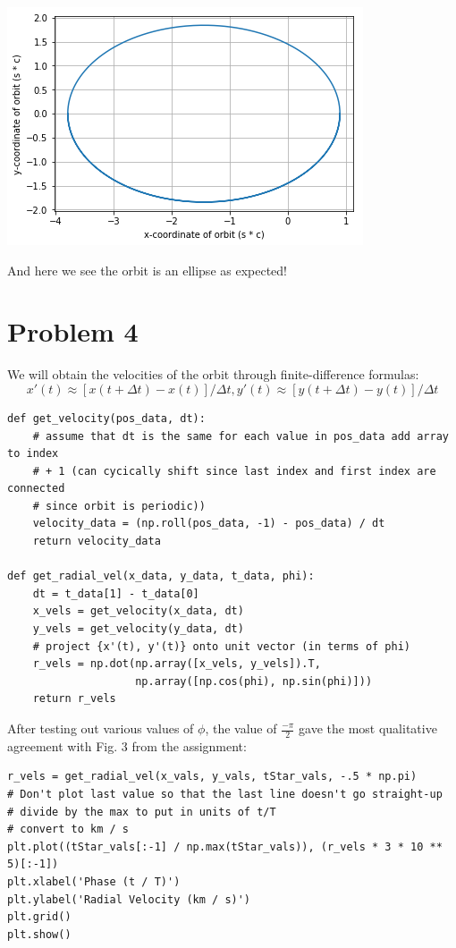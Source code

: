 \documentclass[11pt]{article}
\begin{document}
\includegraphics[width=.9\linewidth]{./obipy-resources/112750_r.png}

And here we see the orbit is an ellipse as expected!

\section*{Problem 4}
\label{sec-4}
We will obtain the velocities of the orbit through finite-difference formulas:
$$ x'(t) \approx [x(t + \Delta t) - x(t)] / \Delta t, y'(t) \approx [y(t +
\Delta t) - y(t)] / \Delta t$$

\begin{verbatim}
def get_velocity(pos_data, dt):
    # assume that dt is the same for each value in pos_data add array to index
    # + 1 (can cycically shift since last index and first index are connected
    # since orbit is periodic))
    velocity_data = (np.roll(pos_data, -1) - pos_data) / dt
    return velocity_data

def get_radial_vel(x_data, y_data, t_data, phi):
    dt = t_data[1] - t_data[0]
    x_vels = get_velocity(x_data, dt)
    y_vels = get_velocity(y_data, dt)
    # project {x'(t), y'(t)} onto unit vector (in terms of phi)
    r_vels = np.dot(np.array([x_vels, y_vels]).T, 
                    np.array([np.cos(phi), np.sin(phi)]))
    return r_vels
\end{verbatim}


After testing out various values of $\phi$, the value of $\frac{-\pi}{2}$ gave
the most qualitative agreement with Fig. 3 from the assignment:

\begin{verbatim}
r_vels = get_radial_vel(x_vals, y_vals, tStar_vals, -.5 * np.pi)
# Don't plot last value so that the last line doesn't go straight-up
# divide by the max to put in units of t/T
# convert to km / s
plt.plot((tStar_vals[:-1] / np.max(tStar_vals)), (r_vels * 3 * 10 ** 5)[:-1])
plt.xlabel('Phase (t / T)')
plt.ylabel('Radial Velocity (km / s)')
plt.grid()
plt.show()
\end{verbatim}
\end{document}
